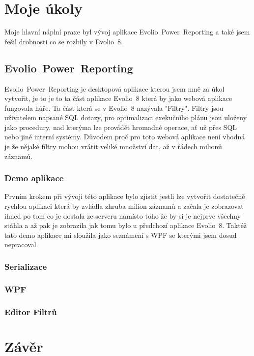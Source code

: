 \documentclass[czech,bachelor,dept460,male,csharp]{diploma}
\newcommand{\EvolioEight}{Evolio~8}
\newcommand{\EFilters}{Evolio~Power~Reporting}
\begin{document}
\section{Moje úkoly}
	Moje hlavní náplní praxe byl vývoj aplikace {\EFilters} a také jsem řešil drobnosti co se rozbily v {\EvolioEight}.
	\subsection{\EFilters}
		{\EFilters} je desktopová aplikace kterou jsem mně za úkol vytvořit, je to je to ta část aplikace {\EvolioEight} která by jako webová aplikace fungovala hůře.
		Ta část která se v {\EvolioEight} nazývala "Filtry".
		Filtry jsou uživatelem napsané SQL dotazy, pro optimalizaci exekučního plánu jsou uloženy jako procedury, nad kterýma lze provádět hromadné operace, ať už přes SQL nebo jiné interní systémy.
		Důvodem proč pro toto webová aplikace není vhodná je že nějaké filtry mohou vrátit veliké množství dat, až v řádech milionů záznamů.
		\subsubsection{Demo aplikace}
			Prvním krokem při vývoji této aplikace bylo zjistit jestli lze vytvořit dostatečně rychlou aplikaci která by zvládla zhruba milion záznamů a začala je zobrazovat ihned po tom co je dostala ze serveru namísto toho že by si je nejprve všechny stáhla a až pak je zobrazila jak tomu bylo u předchozí aplikace {\EvolioEight}.
			Taktéž tato demo aplikace mi sloužila jako seznámení s WPF se kterými jsem dosud nepracoval.
		\subsubsection{Serializace}

		\subsubsection{WPF}

		\subsubsection{Editor Filtrů}
\section{Závěr}


\printbibliography[title={Literatura}, heading=bibintoc]


\end{document}

